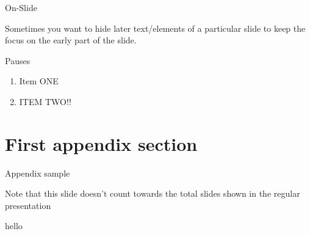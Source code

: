 \documentclass[12pt]{beamer}
\begin{document}
\begin{frame}{On-Slide}

	Sometimes you want to hide later text/elements of a particular slide to keep the focus on the early part of the slide.

	\bigskip


\end{frame}
\begin{frame}{Pauses}
\begin{enumerate}
\item Item ONE
\pause
\item ITEM TWO!! 
\end{enumerate}
\end{frame}


\appendix


{\BackgroundShaded
\begin{frame}
\end{frame}
}







\section{First appendix section}

\begin{frame}{Appendix sample}

	Note that this slide doesn't count towards the total slides shown in the regular presentation

\end{frame}

\begin{frame}{hello}
    
\end{frame}

\end{document}
